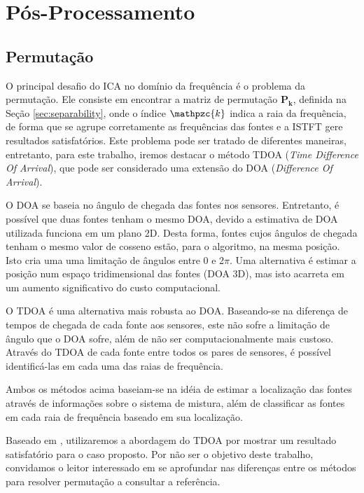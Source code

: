     
\section{Pós-Processamento}
    \subsection{Permutação} \label{sec:tdoa}
    O principal desafio do ICA no domínio da frequência é o problema da permutação. Ele consiste em encontrar a matriz de permutação $\mathbf{P_k}$, definida na Seção \ref{sec:separability}, onde o índice $\mathpzc{k}$ indica a raia da frequência, de forma que se agrupe corretamente as frequências das fontes e a ISTFT gere resultados satisfatórios.
    Este problema pode ser tratado de diferentes maneiras, entretanto, para este trabalho, iremos destacar o método TDOA (\textit{Time Difference Of Arrival}), que pode ser considerado uma extensão do DOA (\textit{Difference Of Arrival}).
    
    O DOA se baseia no ângulo de chegada das fontes nos sensores. Entretanto, é possível que duas fontes tenham o mesmo DOA, devido a estimativa de DOA utilizada funciona em um plano 2D. Desta forma, fontes cujos ângulos de chegada tenham o mesmo valor de cosseno estão, para o algoritmo, na mesma posição. Isto cria uma uma limitação de ângulos entre 0 e 2$\pi$. Uma alternativa é estimar a posição num espaço tridimensional das fontes (DOA 3D), mas isto acarreta em um aumento significativo do custo computacional.
    
    O TDOA é uma alternativa mais robusta ao DOA. Baseando-se na diferença de tempos de chegada de cada fonte aos sensores, este não sofre a limitação de ângulo que o DOA sofre, além de não ser computacionalmente mais custoso. Através do TDOA de cada fonte entre todos os pares de sensores, é possível identificá-las em cada uma das raias de frequência.
    
    Ambos os métodos acima baseiam-se na idéia de estimar a localização das fontes através de informações sobre o sistema de mistura, além de classificar as fontes em cada raia de frequência baseado em sua localização.
    
    Baseado em \cite{LuizVictorio}, utilizaremos a abordagem do TDOA por mostrar um resultado satisfatório para o caso proposto. Por não ser o objetivo deste trabalho, convidamos o leitor interessado em se aprofundar nas diferenças entre os métodos para resolver permutação a consultar a referência.